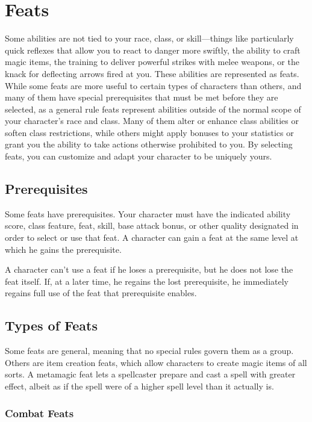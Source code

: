 \chapter{Feats}

\label{f0}        				
Some abilities are not tied to your race, class, or skill---things like particularly quick reflexes that allow you to react to danger more swiftly, the ability to craft magic items, the training to deliver powerful strikes with melee weapons, or the knack for deflecting arrows fired at you. These abilities are represented as feats. While some feats are more useful to certain types of characters than others, and many of them have special prerequisites that must be met before they are selected, as a general rule feats represent abilities outside of the normal scope of your character's race and class. Many of them alter or enhance class abilities or soften class restrictions, while others might apply bonuses to your statistics or grant you the ability to take actions otherwise prohibited to you. By selecting feats, you can customize and adapt your character to be uniquely yours. 
				
\section{Prerequisites}

				
Some feats have prerequisites. Your character must have the indicated ability score, class feature, feat, skill, base attack bonus, or other quality designated in order to select or use that feat. A character can gain a feat at the same level at which he gains the prerequisite.
				
A character can't use a feat if he loses a prerequisite, but he does not lose the feat itself. If, at a later time, he regains the lost prerequisite, he immediately regains full use of the feat that prerequisite enables.
				
\section{Types of Feats}

				
Some feats are general, meaning that no special rules govern them as a group. Others are item creation feats, which allow characters to create magic items of all sorts. A metamagic feat lets a spellcaster prepare and cast a spell with greater effect, albeit as if the spell were of a higher spell level than it actually is.
				
\subsection{Combat Feats}

